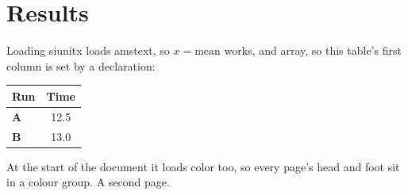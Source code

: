 \documentclass{article}
\begin{document}
\section{Results}
Loading siunitx loads amstext, so $x = \text{mean}$ works, and array, so this table's
first column is set by a declaration:
\begin{center}
\begin{tabular}{>{\bfseries}l|c}
Run & Time \\ \hline
A & 12.5 \\
B & 13.0
\end{tabular}
\end{center}
At the start of the document it loads color too, so every page's head and foot sit in
\color{red}a colour group\color{black}.
\newpage
A second page.
\end{document}
